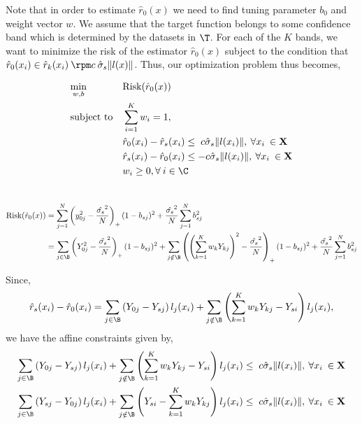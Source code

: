 Note that in order to estimate $\hat{r}_0(x)$ we need to find tuning
parameter $b_0$ and weight vector $w$. We assume that the target function
belongs to some confidence band which is determined by the datasets in $\T$. For
each of the $K$ bands, we want to minimize the risk of the estimator
$\hat{r}_0(x)$ subject to the condition that $\hat{r}_0(x_i) \in \hat{r}_k(x_i)
\: \rpm c \: \hat{\sigma}_s \| l(x)\|$. Thus, our optimization problem thus
becomes,

\begin{equation*}
\begin{aligned}
&   \underset{w,b}{\text{min}}  
&&   \text{Risk}(\hat{r}_0(x)) \\
&   \text{subject to} &&\sum_{i = 1}^{K} w_i = 1,\\
&&&	\hat{r}_0(x_i) - \hat{r}_s(x_i) \leq  \; c  \hat{\sigma}_s \| l(x_i)\|,\:
\forall x_i \: \in \mathbf{X}\\
&&&	\hat{r}_s(x_i) - \hat{r}_0(x_i) \leq  -c  \hat{\sigma}_s \| l(x_i)\|,\:
\forall x_i \: \in \mathbf{X}\\
&&&	w_i \geq 0, \forall \: i \in \C \\
&&&
\end{aligned}
\end{equation*}

\begin{align}
 \text{Risk}(\hat{r}_0(x)) & = \sum_{j = 1}^{N} \left(y^2_{0j} -
 \frac{\hat{\sigma_s}^2}{N}\right)_+(1-b_{sj})^2 + \frac{\hat{\sigma_s}^2}{N}
 \sum_{j = 1}^{N} b^2_{sj}\\
 & = \sum_{j \in \B} \left(Y^2_{0j} - 
 \frac{\hat{\sigma_s}^2}{N}\right)_+(1-b_{sj})^2 + \sum_{j \notin \B} \left(
 \left(\sum_{k=1}^{K}w_kY_{kj} \right)^2 -
 \frac{\hat{\sigma_s}^2}{N}\right)_+(1-b_{sj})^2 +
 \frac{\hat{\sigma_s}^2}{N}
 \sum_{j = 1}^{N} b^2_{sj}
\end{align}

Since,
\begin{align}
\hat{r}_s(x_i) - \hat{r}_0(x_i)  
 = \sum_{j \in \B} \left(Y_{0j} - Y_{sj} \right)l_j(x_i) + \sum_{j \notin
\B} \left( \sum_{k=1}^{K}w_kY_{kj} - Y_{si}\right)l_j(x_i), 
\end{align}
we have the affine constraints given by,
\begin{align*}
\sum_{j \in \B} \left(Y_{0j} - Y_{sj} \right)l_j(x_i) + \sum_{j \notin
\B} \left( \sum_{k=1}^{K}w_kY_{kj}  - Y_{si}\right)l_j(x_i) 
&\leq  \; c  \hat{\sigma}_s \| l(x_i)\|,\:
\forall x_i \: \in \mathbf{X}\\
\sum_{j \in \B} \left(Y_{sj} - Y_{0j} \right)l_j(x_i) + \sum_{j \notin
\B} \left( Y_{si} - \sum_{k=1}^{K}w_kY_{kj}  \right)l_j(x_i) 
&\leq  \; c  \hat{\sigma}_s \| l(x_i)\|,\:
\forall x_i \: \in \mathbf{X}\\
\end{align*}
